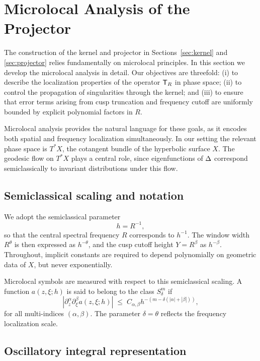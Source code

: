 \section{Microlocal Analysis of the Projector}\label{sec:microlocal}

The construction of the kernel and projector in Sections~\ref{sec:kernel} and \ref{sec:projector} relies fundamentally on microlocal principles. In this section we develop the microlocal analysis in detail. Our objectives are threefold: (i) to describe the localization properties of the operator $\mathsf{T}_R$ in phase space; (ii) to control the propagation of singularities through the kernel; and (iii) to ensure that error terms arising from cusp truncation and frequency cutoff are uniformly bounded by explicit polynomial factors in $R$.

Microlocal analysis provides the natural language for these goals, as it encodes both spatial and frequency localization simultaneously. In our setting the relevant phase space is $T^*X$, the cotangent bundle of the hyperbolic surface $X$. The geodesic flow on $T^*X$ plays a central role, since eigenfunctions of $\Delta$ correspond semiclassically to invariant distributions under this flow.

\subsection{Semiclassical scaling and notation}\label{subsec:micro-semiclassical}

We adopt the semiclassical parameter
\[
h = R^{-1},
\]
so that the central spectral frequency $R$ corresponds to $h^{-1}$. The window width $R^\theta$ is then expressed as $h^{-\theta}$, and the cusp cutoff height $Y=R^\beta$ as $h^{-\beta}$. Throughout, implicit constants are required to depend polynomially on geometric data of $X$, but never exponentially.

Microlocal symbols are measured with respect to this semiclassical scaling. A function $a(z,\xi;h)$ is said to belong to the class $S^m_\delta$ if
\[
|\partial_z^\alpha \partial_\xi^\beta a(z,\xi;h)| \;\le\; C_{\alpha,\beta} h^{-(m-\delta(|\alpha|+|\beta|))},
\]
for all multi-indices $(\alpha,\beta)$. The parameter $\delta=\theta$ reflects the frequency localization scale.

\subsection{Oscillatory integral representation}\label{subsec:micro-oscillatory}

